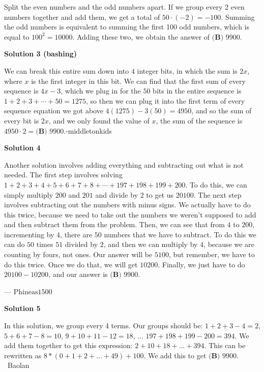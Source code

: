 \begin{enumerate}
Split the even numbers and the odd numbers apart. If we group every 2 even numbers together and add them, we get a total of $50\cdot (-2)=-100$. Summing the odd numbers is equivalent to summing the first 100 odd numbers, which is equal to $100^2=10000$. Adding these two, we obtain the answer of $\boxed{\textbf{(B) }9900}$.

 



\textbf{Solution 3 (bashing)}

We can break this entire sum down into $4$ integer bits, in which the sum is $2x$, where $x$ is the first integer in this bit. We can find that the first sum of every sequence is $4x-3$, which we plug in for the $50$ bits in the entire sequence is $1+2+3+\cdots+50=1275$, so then we can plug it into the first term of every sequence equation we got above $4(1275)-3(50)=4950$, and so the sum of every bit is $2x$, and we only found the value of $x$, the sum of the sequence is $4950\cdot2=\boxed{\textbf{(B) } 9900}$.-middletonkids

 



\textbf{Solution 4}

Another solution involves adding everything and subtracting out what is not needed.  The first step involves solving $1+2+3+4+5+6+7+8+\cdots+197+198+199+200$.  To do this, we can simply multiply $200$ and $201$ and divide by $2$ to get us $20100$.  The next step involves subtracting out the numbers with minus signs.  We actually have to do this twice, because we need to take out the numbers we weren’t supposed to add and then subtract them from the problem.  Then, we can see that from $4$ to $200$, incrementing by $4$, there are $50$ numbers that we have to subtract.  To do this we can do $50$ times $51$ divided by $2$, and then we can multiply by $4$, because we are counting by fours, not ones.  Our answer will be $5100$, but remember, we have to do this twice.  Once we do that, we will get $10200$.  Finally, we just have to do $20100-10200$, and our answer is $\boxed{\textbf{(B) }9900}$.

 — $\text{Phineas}1500$




\textbf{Solution 5}

In this solution, we group every 4 terms. Our groups should be: $1 + 2 + 3 - 4 = 2$, $5 + 6 + 7 - 8 = 10$, $9 + 10 + 11 - 12 = 18$, ... $197 + 198 + 199 - 200 = 394$. We add them together to get this expression: $2 + 10 + 18 + ... + 394$. This can be rewritten as $8 * (0 + 1 + 2 + ... + 49) + 100$. We add this to get $\boxed{\textbf{(B) }9900}$.    ~Baolan


\end{enumerate}
